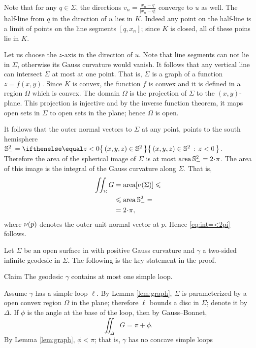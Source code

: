 Note that for any $q\in \Sigma$, the directions $v_n=\tfrac{x_n-q}{|x_n-q|}$ converge to $u$ as well.
The half-line from $q$ in the direction of $u$ lies in $K$.
Indeed any point on the half-line is a limit of points on the line segments $[q,x_n]$;
since $K$ is closed, all of these poins lie in $K$.


Let us choose the $z$-axis in the direction of $u$.
Note that line segments can not lie in $\Sigma$, otherwise its Gauss curvature would vanish.
It follows that any vertical line can intersect $\Sigma$ at most at one point.
That is, $\Sigma$ is a graph of a function $z=f(x,y)$.
Since $K$ is convex, the function $f$ is convex and it is defined in a region $\Omega$ which is convex.
The domain $\Omega$ is the projection of $\Sigma$ to the $(x,y)$-plane.
This projection is injective and by the inverse function theorem, it maps open sets in $\Sigma$ to open sets in the plane;
hence $\Omega$ is open.

It follows that the outer normal vectors to $\Sigma$ at any point, points to the south hemisphere $\SS^2_-=\set{(x,y,z)\in\SS^2}{z< 0}$.
Therefore the area of the spherical image of $\Sigma$ is at most $\area\SS^2_-= 2\cdot\pi$.
The area of this image is the integral of the Gauss curvature along $\Sigma$.
That is,
\begin{align*}
\iint_{\Sigma}G&=\area[\Norm(\Sigma)]\le 
\\
&\le \area\SS^2_-=
\\
&=2\cdot\pi,
\end{align*}
where $\nu(p)$ denotes the outer unit normal vector at $p$.
Hence \ref{eq:int=<2pi} follows.
\qeds

Let $\Sigma$ be an open surface in with positive Gauss curvature and $\gamma$ a two-sided infinite geodesic in $\Sigma$.
The following is the key statement in the proof.

\begin{thm}{Claim}
The geodesic $\gamma$ contains at most one simple loop.
\end{thm}

Assume $\gamma$ has a simple loop $\ell$.
By Lemma \ref{lem:graph}, $\Sigma$ is parameterized by a open convex region $\Omega$ in the plane;
therefore $\ell$ bounds a disc in $\Sigma$; denote it by $\Delta$.
If $\phi$ is the angle at the base of the loop, then by Gauss--Bonnet,
\[\iint_\Delta G=\pi+\phi.\] 
By Lemma \ref{lem:graph}, $\phi<\pi$; that is, $\gamma$ has no concave simple loops 

